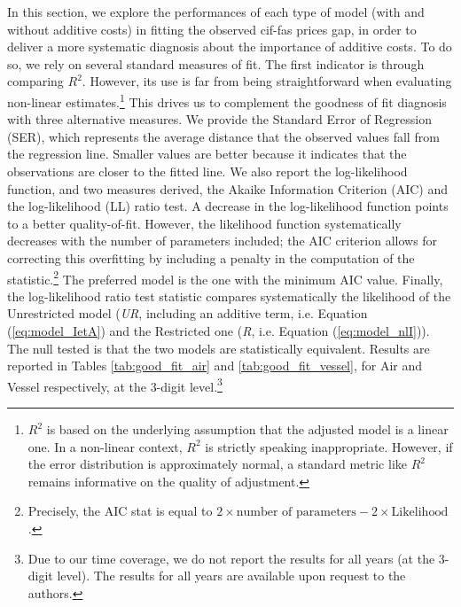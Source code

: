 \documentclass[a4paper,11pt]{article}
\begin{document}
In this section, we explore the performances of each type of model (with and without additive costs) in fitting the observed cif-fas prices gap, in order to deliver a more systematic diagnosis about the importance of additive costs. To do so, we rely on several standard measures of fit. The first indicator is through comparing $R^{2}$. However, its use is far from being straightforward when evaluating non-linear estimates.\footnote{$R^2$ is based on the underlying assumption that the adjusted model is a linear one. In a non-linear context, $R^2$ is  strictly speaking inappropriate. However, if the error distribution is approximately normal, a standard metric like $R^2$ remains informative on the quality of adjustment.} This drives us to complement the goodness of fit diagnosis with three alternative measures. We provide the Standard Error of Regression (SER), which represents the average distance that the observed values fall from the regression line. Smaller values are better because it indicates that the observations are closer to the fitted line. We also report the log-likelihood function, and two measures derived, the Akaike Information Criterion (AIC) and the log-likelihood (LL) ratio test. A decrease in the log-likelihood function points to a better quality-of-fit. However, the likelihood function systematically decreases with the number of parameters included; the AIC criterion allows for correcting this overfitting by including a penalty in the computation of the statistic.\footnote{Precisely, the AIC stat is equal to $2 \times \textrm{number of parameters} - 2 \times \textrm{Likelihood} $.} The preferred model is the one with the minimum AIC value. Finally, the log-likelihood ratio test statistic compares systematically the likelihood of the Unrestricted model (\emph{UR}, including an additive term, i.e. Equation (\ref{eq:model_IetA}) and the Restricted one (\emph{R}, i.e. Equation (\ref{eq:model_nlI})). The null tested is that the two models are statistically equivalent. Results are reported in Tables \ref{tab:good_fit_air} and \ref{tab:good_fit_vessel}, for Air and Vessel respectively, at the 3-digit level.\footnote{Due to our time coverage, we do not report the results for all years (at the 3-digit level). The results for all years are available upon request to the authors.}\medskip
\end{document}
